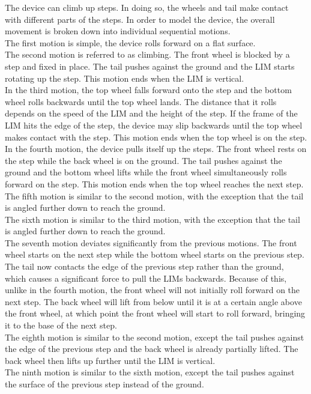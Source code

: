 The device can climb up steps. In doing so, the wheels and tail make contact with different parts of the steps. In order to model the device, the overall movement is broken down into individual sequential motions.\\
The first motion is simple, the device rolls forward on a flat surface.\\
The second motion is referred to as climbing. The front wheel is blocked by a step and fixed in place. The tail pushes against the ground and the LIM starts rotating up the step. This motion ends when the LIM is vertical.\\
In the third motion, the top wheel falls forward onto the step and the bottom wheel rolls backwards until the top wheel lands. The distance that it rolls depends on the speed of the LIM and the height of the step. If the frame of the LIM hits the edge of the step, the device may slip backwards until the top wheel makes contact with the step. This motion ends when the top wheel is on the step.\\
In the fourth motion, the device pulls itself up the steps. The front wheel rests on the step while the back wheel is on the ground. The tail pushes against the ground and the bottom wheel lifts while the front wheel simultaneously rolls forward on the step. This motion ends when the top wheel reaches the next step.\\
The fifth motion is similar to the second motion, with the exception that the tail is angled further down to reach the ground.\\
The sixth motion is similar to the third motion, with the exception that the tail is angled further down to reach the ground.\\
The seventh motion deviates significantly from the previous motions. The front wheel starts on the next step while the bottom wheel starts on the previous step. The tail now contacts the edge of the previous step rather than the ground, which causes a significant force to pull the LIMs backwards. Because of this, unlike in the fourth motion, the front wheel will not initially roll forward on the next step. The back wheel will lift from below until it is at a certain angle above the front wheel, at which point the front wheel will start to roll forward, bringing it to the base of the next step.\\
The eighth motion is similar to the second motion, except the tail pushes against the edge of the previous step and the back wheel is already partially lifted. The back wheel then lifts up further until the LIM is vertical.\\
The ninth motion is similar to the sixth motion, except the tail pushes against the surface of the previous step instead of the ground.